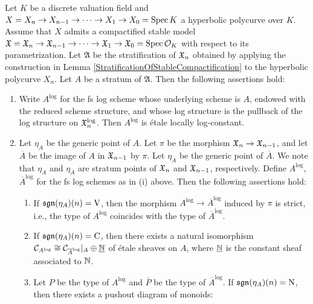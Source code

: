 \begin{lem}\label{DescriptionOfLogStructureOfStableCompactification}
  Let $K$ be a discrete valuation field and $X = X_n \to X_{n - 1} \to \cdots \to X_1 \to X_0 = \mathrm{Spec} \, K$ a hyperbolic polycurve over $K$. Assume that $X$ admits a compactified stable model $\mathfrak{X} = \mathfrak{X}_n \to \mathfrak{X}_{n - 1} \to \cdots \to \mathfrak{X}_1 \to \mathfrak{X}_0 = \mathrm{Spec} \, \mathcal{O}_K$ with respect to its parametrization. Let $\mathfrak{A}$ be the stratification of $\mathfrak{X}_n$ obtained by applying the construction in Lemma \ref{StratificationOfStableCompactification} to the hyperbolic polycurve $X_n$. Let $A$ be a stratum of $\mathfrak{A}$. Then the following assertions hold:
  \begin{enumerate}
    \item Write $A^\log$ for the fs log scheme whose underlying scheme is $A$, endowed with the reduced scheme structure, and whose log structure is the pullback of the log structure on $\mathfrak{X}_n^{\mathrm{log}}$. Then $A^\log$ is \'{e}tale locally log-constant.
    \item Let $\eta_A$ be the generic point of $A$. Let $\pi$ be the morphism $\mathfrak{X}_n \to \mathfrak{X}_{n - 1}$, and let $\overline{A}$ be the image of $A$ in $\mathfrak{X}_{n - 1}$ by $\pi$. Let $\eta_{\overline{A}}$ be the generic point of $\overline{A}$. We note that $\eta_A$ and $\eta_{\overline{A}}$ are stratum points of $\mathfrak{X}_n$ and $\mathfrak{X}_{n - 1}$, respectively. Define $A^\log$, $\overline{A}^\log$ for the fs log schemes as in (i) above. Then the following assertions hold:
      \begin{enumerate}
        \item If $\mathfrak{sgn}(\eta_A)(n) = \mathrm{V}$, then the morphism $A^\log \to \overline{A}^\log$ induced by $\pi$ is strict, i.e., the type of $A^\log$ coincides with the type of $\overline{A}^\log$.
        \item If $\mathfrak{sgn}(\eta_A)(n) = \mathrm{C}$, then there exists a natural isomorphism $\mathcal{C}_{A^{\mathrm{log}}} \cong \mathcal{C}_{\overline{A}^{\mathrm{log}}}|_A \oplus \underline{\mathbb{N}}$ of \'{e}tale sheaves on $A$, where $\underline{\mathbb{N}}$ is the constant sheaf associated to $\mathbb{N}$.
        \item Let $P$ be the type of $A^\log$ and $\overline{P}$ be the type of $\overline{A}^\log$. If $\mathfrak{sgn}(\eta_A)(n) = \mathrm{N}$, then there exists a pushout diagram of monoids:
        \begin{center}
          \begin{tikzpicture}[auto]

\end{tikzpicture}
\end{center}
\end{enumerate}
\end{enumerate}
\end{lem}
